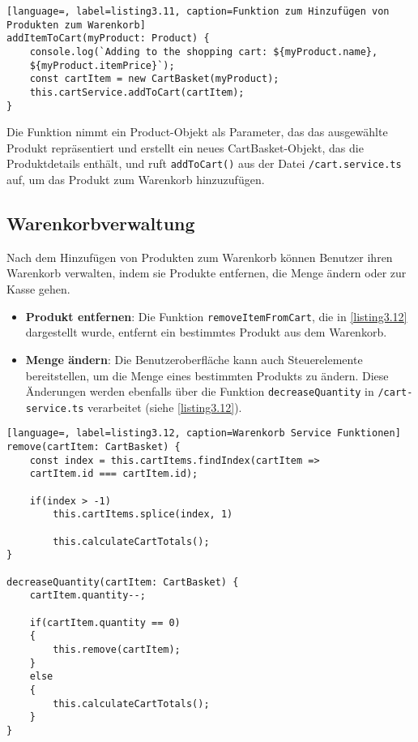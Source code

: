 \begin{lstlisting}[language=, label=listing3.11, caption=Funktion zum Hinzufügen von Produkten zum Warenkorb]
addItemToCart(myProduct: Product) {
	console.log(`Adding to the shopping cart: ${myProduct.name}, 
	${myProduct.itemPrice}`);
	const cartItem = new CartBasket(myProduct);
	this.cartService.addToCart(cartItem);
}
\end{lstlisting}

Die Funktion nimmt ein Product-Objekt als Parameter, das das ausgewählte Produkt repräsentiert und erstellt ein neues CartBasket-Objekt, das die Produktdetails enthält, und ruft \verb*|addToCart()| aus der Datei \verb*|/cart.service.ts| auf, um das Produkt zum Warenkorb hinzuzufügen.

\subsection{Warenkorbverwaltung}

Nach dem Hinzufügen von Produkten zum Warenkorb können Benutzer ihren Warenkorb verwalten, indem sie Produkte entfernen, die Menge ändern oder zur Kasse gehen.

\begin{itemize}
	\item \textbf{Produkt entfernen}: Die Funktion \verb*|removeItemFromCart|, die in \ref{listing3.12} dargestellt wurde, entfernt ein bestimmtes Produkt aus dem Warenkorb.
	\item \textbf{Menge ändern}: Die Benutzeroberfläche kann auch Steuerelemente bereitstellen, um die Menge eines bestimmten Produkts zu ändern. Diese Änderungen werden ebenfalls über die Funktion \verb*|decreaseQuantity| in \verb*|/cart-service.ts| verarbeitet (siehe \ref{listing3.12}).
\end{itemize}

\begin{lstlisting}[language=, label=listing3.12, caption=Warenkorb Service Funktionen]
remove(cartItem: CartBasket) {
	const index = this.cartItems.findIndex(cartItem => 
	cartItem.id === cartItem.id);
	
	if(index > -1)
		this.cartItems.splice(index, 1)
	
		this.calculateCartTotals();
}

decreaseQuantity(cartItem: CartBasket) {
	cartItem.quantity--;
	
	if(cartItem.quantity == 0)
	{
		this.remove(cartItem);
	}
	else
	{
		this.calculateCartTotals();
	}
}
\end{lstlisting}

